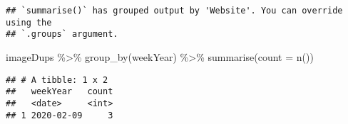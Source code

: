 \documentclass[
]{article}
\newenvironment{Shaded}{\begin{snugshade}}{\end{snugshade}}
\newcommand{\AttributeTok}[1]{\textcolor[rgb]{0.77,0.63,0.00}{#1}}
\newcommand{\FunctionTok}[1]{\textcolor[rgb]{0.00,0.00,0.00}{#1}}
\newcommand{\NormalTok}[1]{#1}
\newcommand{\SpecialCharTok}[1]{\textcolor[rgb]{0.00,0.00,0.00}{#1}}
\begin{document}
\begin{verbatim}
## `summarise()` has grouped output by 'Website'. You can override using the
## `.groups` argument.
\end{verbatim}

\begin{Shaded}
\begin{Highlighting}[]
\NormalTok{imageDups }\SpecialCharTok{\%\textgreater{}\%} \FunctionTok{group\_by}\NormalTok{(weekYear) }\SpecialCharTok{\%\textgreater{}\%} \FunctionTok{summarise}\NormalTok{(}\AttributeTok{count =} \FunctionTok{n}\NormalTok{())}
\end{Highlighting}
\end{Shaded}

\begin{verbatim}
## # A tibble: 1 x 2
##   weekYear   count
##   <date>     <int>
## 1 2020-02-09     3
\end{verbatim}
\end{document}
